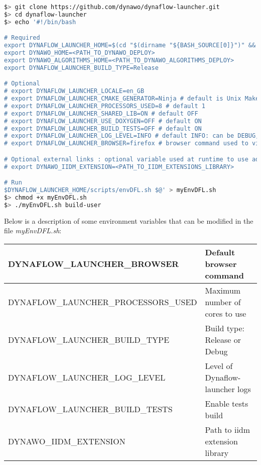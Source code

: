 \documentclass[a4paper, 12pt]{report}
\begin{document}
\begin{lstlisting}[language=bash, columns=fullflexible]
$> git clone https://github.com/dynawo/dynaflow-launcher.git
$> cd dynaflow-launcher
$> echo '#!/bin/bash

# Required
export DYNAFLOW_LAUNCHER_HOME=$(cd "$(dirname "${BASH_SOURCE[0]}")" && pwd)
export DYNAWO_HOME=<PATH_TO_DYNAWO_DEPLOY>
export DYNAWO_ALGORITHMS_HOME=<PATH_TO_DYNAWO_ALGORITHMS_DEPLOY>
export DYNAFLOW_LAUNCHER_BUILD_TYPE=Release

# Optional
# export DYNAFLOW_LAUNCHER_LOCALE=en_GB
# export DYNAFLOW_LAUNCHER_CMAKE_GENERATOR=Ninja # default is Unix Makefiles
# export DYNAFLOW_LAUNCHER_PROCESSORS_USED=8 # default 1
# export DYNAFLOW_LAUNCHER_SHARED_LIB=ON # default OFF
# export DYNAFLOW_LAUNCHER_USE_DOXYGEN=OFF # default ON
# export DYNAFLOW_LAUNCHER_BUILD_TESTS=OFF # default ON
# export DYNAFLOW_LAUNCHER_LOG_LEVEL=INFO # default INFO: can be DEBUG, INFO, WARN, ERROR
# export DYNAFLOW_LAUNCHER_BROWSER=firefox # browser command used to visualize test coverage. default: firefox

# Optional external links : optional variable used at runtime to use additional iidm extension
# export DYNAWO_IIDM_EXTENSION=<PATH_TO_IIDM_EXTENSIONS_LIBRARY>

# Run
$DYNAFLOW_LAUNCHER_HOME/scripts/envDFL.sh $@' > myEnvDFL.sh
$> chmod +x myEnvDFL.sh
$> ./myEnvDFL.sh build-user
\end{lstlisting}

Below is a description of some environment variables that can be modified in the file \textit{myEnvDFL.sh}:

\begin{center}
\begin{tabular}{|l|l|}
  \hline
   \tiny{DYNAFLOW\_LAUNCHER\_BROWSER} & \small{Default browser command} \\
  \hline
   \tiny{DYNAFLOW\_LAUNCHER\_PROCESSORS\_USED} & \small{Maximum number of cores to use} \\
  \hline
   \tiny{DYNAFLOW\_LAUNCHER\_BUILD\_TYPE} & \small{Build type: Release or Debug} \\
  \hline
   \tiny{DYNAFLOW\_LAUNCHER\_LOG\_LEVEL} & \small{Level of Dynaflow-launcher logs} \\
  \hline
   \tiny{DYNAFLOW\_LAUNCHER\_BUILD\_TESTS} & \small{Enable tests build} \\
  \hline
   \tiny{DYNAWO\_IIDM\_EXTENSION} & \small{Path to iidm extension library} \\
  \hline
\end{tabular}
\end{center}
\end{document}
